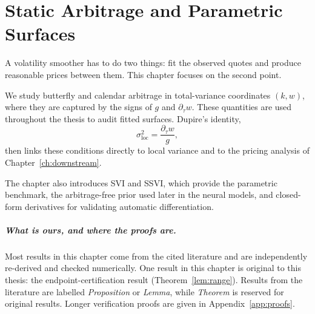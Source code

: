 %
%

\chapter{Static Arbitrage and Parametric Surfaces}\label{ch:theory}

A volatility smoother has to do two things: fit the observed quotes and produce reasonable prices between them. This chapter focuses on the second point.

We study butterfly and calendar arbitrage in total-variance coordinates $(k,w)$, where they are captured by the signs of $g$ and $\partial_\tau w$. These quantities are used throughout the thesis to audit fitted surfaces. Dupire's identity,
\[
\sigma_{\mathrm{loc}}^2=\frac{\partial_\tau w}{g},
\]
then links these conditions directly to local variance and to the pricing analysis of Chapter~\ref{ch:downstream}.

The chapter also introduces SVI and SSVI, which provide the parametric benchmark, the arbitrage-free prior used later in the neural models, and closed-form derivatives for validating automatic differentiation.

\paragraph{What is ours, and where the proofs are.}
Most results in this chapter come from the cited literature and are independently re-derived and checked numerically. One result in this chapter is original to this thesis: the endpoint-certification result (Theorem~\ref{lem:range}). Results from the literature are labelled \emph{Proposition} or \emph{Lemma}, while \emph{Theorem} is reserved for original results. Longer verification proofs are given in Appendix~\ref{app:proofs}.



